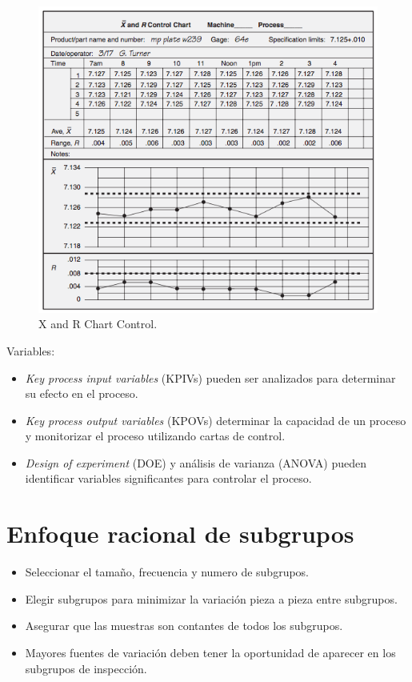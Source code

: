 \documentclass[oneside]{book}
\begin{document}
\begin{figure}[H]
	\centering
	\includegraphics[width=120mm]{imagenes/XandRControl.png}
	\caption{X and R Chart Control.}
	\label{fig:XandRControl}
\end{figure}

Variables:
\begin{itemize}
	\item \textit{Key process input variables} (KPIVs) pueden ser analizados para determinar su efecto en el proceso.
	\item \textit{Key process output variables} (KPOVs) determinar la capacidad de un proceso y monitorizar el proceso utilizando cartas de control.
	\item \textit{Design of experiment} (DOE) y análisis de varianza (ANOVA) pueden identificar variables significantes para controlar el proceso.
\end{itemize}

\section{Enfoque racional de subgrupos}

\begin{itemize}
	\item Seleccionar el tamaño, frecuencia y numero de subgrupos.
	\item Elegir subgrupos para minimizar la variación pieza a pieza entre subgrupos.
	\item Asegurar que las muestras son contantes de todos los subgrupos.
	\item Mayores fuentes de variación deben tener la oportunidad de aparecer en los subgrupos de inspección.
\end{itemize}
\end{document}
